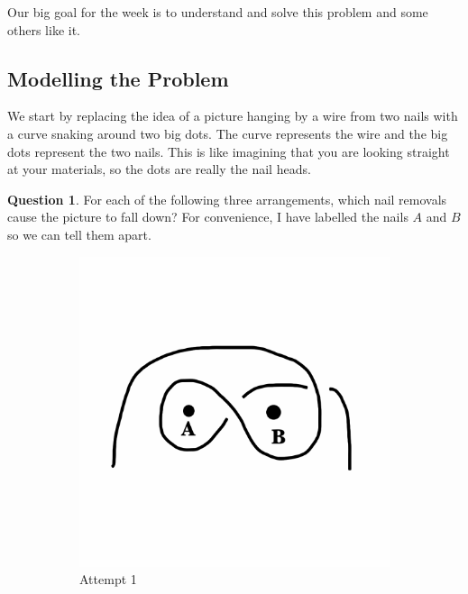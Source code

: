 \documentclass[12pt,letterpaper]{article}
\theoremstyle{definition}
\newtheorem{question}{Question}
\begin{document}
Our big goal for the week is to understand and solve this problem and some others like it.

\subsection*{Modelling the Problem}

We start by replacing the idea of a picture hanging by a wire from two nails with a curve snaking around two big dots.
The curve represents the wire and the big dots represent the two nails.
This is like imagining that you are looking straight at your materials, so the dots are really the nail heads.

\begin{question}
For each of the following three arrangements, which nail removals cause the picture to fall down?
For convenience, I have labelled the nails $A$ and $B$ so we can tell them apart.
\begin{figure}[h!]
    \centering
    \begin{subfigure}[b]{0.3\textwidth}
        \centering
        \includegraphics[width=\textwidth]{rgp01pics/attempt1.png}
        \caption{Attempt 1}
    \end{subfigure}
    \begin{subfigure}[b]{0.3\textwidth}
        \centering

\end{subfigure}
\end{figure}
\end{question}
\end{document}
